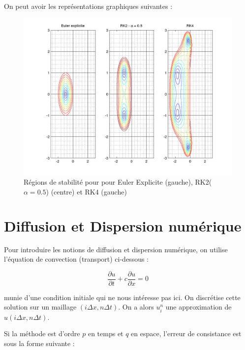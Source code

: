 \documentclass[10pt,a4paper]{amsart}
\begin{document}
On peut avoir les représentations graphiques suivantes :


\begin{figure}[!h]
\begin{center}
\includegraphics[scale=0.6]{rk_stab.png}
\caption{Régions de stabilité pour pour Euler Explicite (gauche), RK2($\alpha = 0.5$) (centre) et RK4 (gauche)}
\end{center}
\end{figure}

%
%

\part{Diffusion et Dispersion numérique}

Pour introduire les notions de diffusion et dispersion numérique, on utilise l'équation de convection (transport) ci-dessous :

\begin{equation}\label{eq transport}
\dfrac{\partial u}{\partial t} + c \dfrac{\partial u}{\partial x} = 0
\end{equation}

munie d'une condition initiale qui ne nous intéresse pas ici.
On discrétise cette solution sur un maillage $\left( i \Delta x, n \Delta t \right)$. On a alors $u_i^n$ une approximation de $u(i \Delta x, n \Delta t )$.

Si la méthode est d'ordre $p$ en temps et $q$ en espace, l'erreur de consistance est sous la forme suivante :
\end{document}
